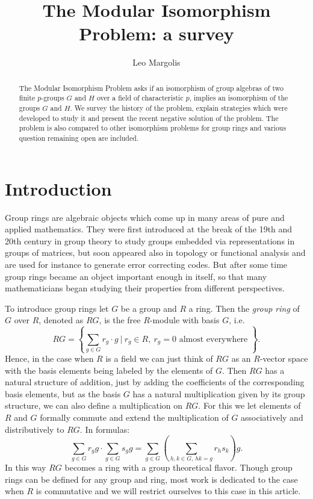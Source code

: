 \documentclass[11pt, a4paper]{amsart}
\title{The Modular Isomorphism Problem: a survey}
\author[L.~Margolis]{Leo Margolis}
\theoremstyle{definition}
\begin{document}
\begin{abstract}
The Modular Isomorphism Problem asks if an isomorphism of group algebras of two finite $p$-groups $G$ and $H$ over a field of characteristic $p$, implies an isomorphism of the groups $G$ and $H$. We survey the history of the problem, explain strategies which were developed to study it and present the recent negative solution of the problem. The problem is also compared to other isomorphism problems for group rings and various question remaining open are included.
\end{abstract}

\maketitle

\tableofcontents

\section{Introduction}

Group rings are algebraic objects which come up in many areas of pure and applied mathematics. They were first introduced at the break of the 19th and 20th century in group theory to study groups embedded via representations in groups of matrices, but soon appeared also in topology or functional analysis and are used for instance to generate error correcting codes. But after some time group rings became an object important enough in itself, so that many mathematicians began studying their properties from different perspectives.

To introduce group rings let $G$ be a group and $R$ a ring. Then the \emph{group ring} of $G$ over $R$, denoted as $RG$, is the free $R$-module with basis $G$, i.e.
\[RG = \left\{\sum_{g \in G} r_g \cdot g \ | \ r_g \in R, \ r_g = 0 \text{ almost everywhere } \right\}. \]
Hence, in the case when $R$ is a field we can just think of $RG$ as an $R$-vector space with the basis elements being labeled by the elements of $G$. Then $RG$ has a natural structure of addition, just by adding the coefficients of the corresponding basis elements, but as the basis $G$ has a natural multiplication given by its group structure, we can also define a multiplication on $RG$. For this we let elements of $R$ and $G$ formally commute and extend the multiplication of $G$ associatively and distributively to $RG$. In formulas:
\[\sum_{g \in G}r_g g \cdot \sum_{g \in G}s_g g = \sum_{g \in G} \left(\sum_{h,k \in G, \ hk = g}r_hs_k  \right)g. \]
In this way $RG$ becomes a ring with a group theoretical flavor. Though group rings can be defined for any group and ring, most work is dedicated to the case when $R$ is commutative and we will restrict ourselves to this case in this article.
\end{document}

